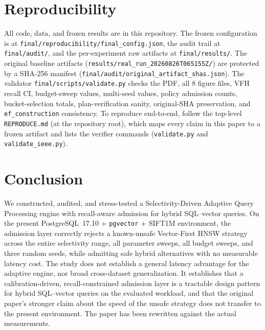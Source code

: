 \documentclass[conference]{IEEEtran}
\begin{document}
\section{Reproducibility}
\label{sec:reproducibility}

All code, data, and frozen results are in this repository. The frozen
configuration is at
\texttt{final/reproducibility/final\_config.json}, the audit trail at
\texttt{final/audit/}, and the per-experiment raw artifacts at
\texttt{final/results/}. The original baseline artifacts
(\texttt{results/real\_run\_20260826T065155Z/}) are protected by a
SHA-256 manifest
(\texttt{final/audit/original\_artifact\_shas.json}). The validator
\texttt{final/scripts/validate.py} checks the PDF, all 8 figure files,
VFH recall CI, budget-sweep values, multi-seed values, policy admission
counts, bucket-selection totals, plan-verification sanity,
original-SHA preservation, and \texttt{ef\_construction} consistency. To
reproduce end-to-end, follow the top-level \texttt{REPRODUCE.md} (at the repository root), which maps every claim in this paper to a frozen artifact and lists the verifier commands (\texttt{validate.py} and \texttt{validate\_ieee.py}).

\section{Conclusion}
\label{sec:conclusion}

We constructed, audited, and stress-tested a Selectivity-Driven Adaptive
Query Processing engine with recall-aware admission for hybrid
SQL--vector queries. On the present PostgreSQL~17.10 + \texttt{pgvector}
+ SIFT1M environment, the admission layer correctly rejects a
known-unsafe Vector-First HNSW strategy across the entire selectivity
range, all parameter sweeps, all budget sweeps, and three random seeds,
while admitting safe hybrid alternatives with no measurable latency
cost. The study does not establish a general latency advantage for the
adaptive engine, nor broad cross-dataset generalization. It establishes
that a calibration-driven, recall-constrained admission layer is a
tractable design pattern for hybrid SQL--vector queries on the evaluated
workload, and that the original paper's stronger claim about the speed
of the unsafe strategy does not transfer to the present environment.
The paper has been rewritten against the actual measurements.



\end{document}
